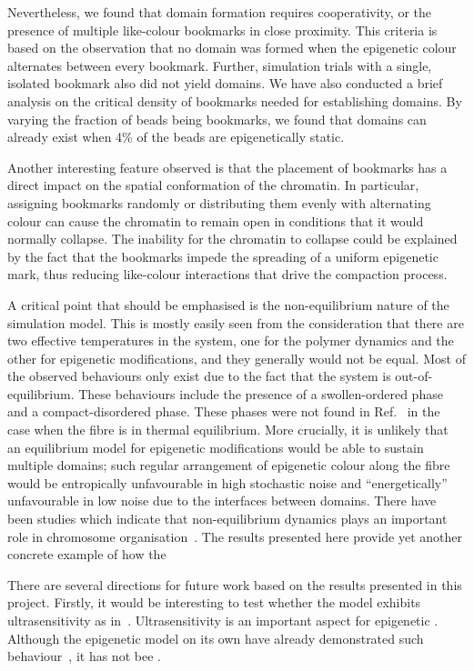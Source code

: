 \documentclass[12pt]{article}
\begin{document}
Nevertheless, we found that domain formation requires cooperativity, or the presence of multiple like-colour bookmarks in close proximity. This criteria is based on the observation that no domain was formed when the epigenetic colour alternates between every bookmark. Further, simulation trials with a single, isolated bookmark also did not yield domains. We have also conducted a brief analysis on the critical density of bookmarks needed for establishing domains. By varying the fraction of beads being bookmarks, we found that domains can already exist when 4\% of the beads are epigenetically static. 

Another interesting feature observed is that the placement of bookmarks has a direct impact on the spatial conformation of the chromatin. In particular, assigning bookmarks randomly or distributing them evenly with alternating colour can cause the chromatin to remain open in conditions that it would normally collapse. The inability for the chromatin to collapse could be explained by the fact that the bookmarks impede the spreading of a uniform epigenetic mark, thus reducing like-colour interactions that drive the compaction process.

A critical point that should be emphasised is the non-equilibrium nature of the simulation model. This is mostly easily seen from the consideration that there are two effective temperatures in the system, one for the polymer dynamics and the other for epigenetic modifications, and they generally would not be equal. Most of the observed behaviours only exist due to the fact that the system is out-of-equilibrium. These behaviours include the presence of a swollen-ordered phase and a compact-disordered phase. These phases were not found in Ref.~\cite{michieletto2016} in the case when the fibre is in thermal equilibrium. More crucially, it is unlikely that an equilibrium model for epigenetic modifications would be able to sustain multiple domains; such regular arrangement of epigenetic colour along the fibre would be entropically unfavourable in high stochastic noise and ``energetically'' unfavourable in low noise due to the interfaces between domains. There have been studies which indicate that non-equilibrium dynamics plays an important role in chromosome organisation~\cite{goloborodko2016a,goloborodko2016b}.  The results presented here provide yet another concrete example of how the

There are several directions for future work based on the results presented in this project. Firstly, it would be interesting to test whether the model exhibits ultrasensitivity as in~\cite{michieletto2016}. Ultrasensitivity is an important aspect for epigenetic . Although the epigenetic model on its own have already demonstrated such behaviour~\cite{sneppen2008}, it has not bee . 
\end{document}

